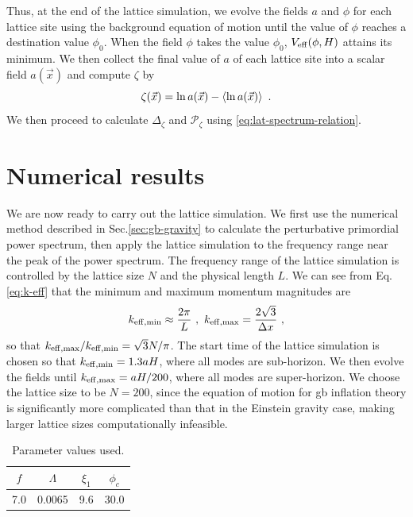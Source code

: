 \documentclass[reprint, 10pt, amsmath, amssymb, floatfix, aps, prd, superscriptaddress, nofootinbib, nobibnotes,twocolumn]{revtex4-1}
\begin{document}
Thus, at the end of the lattice simulation, we evolve the fields $a$ and $\phi$ for each lattice site using the background equation of motion until the value of $\phi$ reaches a destination value $\phi_0$. When the field $\phi$ takes the value $\phi_0$, $V_{\rm eff}(\phi, H)$ attains its minimum. We then collect the final value of $a$ of each lattice site into a scalar field $a(\vec x)$ and compute $\zeta$ by
\begin{equation}
	\zeta(\vec x) = \ln a(\vec x) - \braket{\ln a(\vec x)} \ .
\end{equation}
We then proceed to calculate $\Delta_\zeta$ and $\mathcal P_\zeta$ using \eqref{eq:lat-spectrum-relation}.

\section{Numerical results}
\label{sec:results}
We are now ready to carry out the lattice simulation. We first use the numerical method described in Sec.\ref{sec:gb-gravity} to calculate the perturbative primordial power spectrum, then apply the lattice simulation to the frequency range near the peak of the power spectrum. The frequency range of the lattice simulation is controlled by the lattice size $N$ and the physical length $L$. We can see from Eq.\eqref{eq:k-eff} that the minimum and maximum momentum magnitudes are
\begin{equation}
	k_{\rm eff,min} \approx \frac{2\pi}{L} \ , \ k_{\rm eff,max} = \frac{2\sqrt3}{\Delta x} \ ,
\end{equation}
so that $k_{\rm eff,max} / k_{\rm eff,min} = \sqrt3 N / \pi$. The start time of the lattice simulation is chosen so that $k_{\rm eff,min} = 1.3 aH$, where all modes are sub-horizon. We then evolve the fields until $k_{\rm eff,max} = aH / 200$, where all modes are super-horizon. We choose the lattice size to be $N=200$, since the equation of motion for \ac{gb} inflation theory is significantly more complicated than that in the Einstein gravity case, making larger lattice sizes computationally infeasible.

\begin{table}
    \caption{\label{tab:lat-sim-params}Parameter values used.}
	\begin{tabular}{|c|c|c|c|}
	    \hline
		$f$ & $\Lambda$ & $\xi_1$ & $\phi_c$ \\
        \hline
		7.0 & 0.0065 & 9.6 & 30.0\\
		\hline
	\end{tabular}
\end{table}
\end{document}

